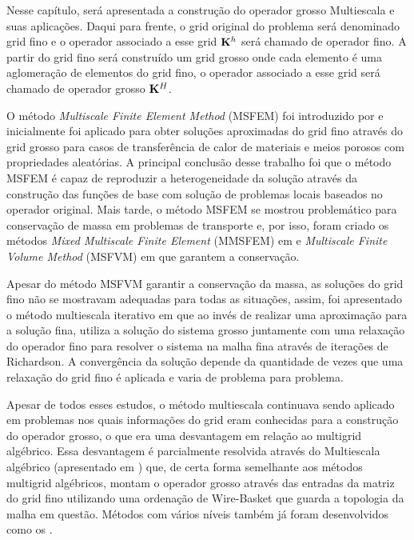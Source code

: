
Nesse capítulo, será apresentada a construção do operador grosso Multiescala e suas aplicações. Daqui para frente, o grid original do problema será denominado grid fino e o operador associado a esse grid $\mathbf{K}^h$ será chamado de operador fino. A partir do grid fino será construído um grid grosso onde cada elemento é uma aglomeração de elementos do grid fino, o operador associado a esse grid será chamado de operador grosso $\mathbf{K}^H$.


O método \textit{Multiscale Finite Element Method} (MSFEM) foi introduzido por \citet{thomashou} e inicialmente foi aplicado para obter soluções aproximadas do grid fino através do grid grosso para casos de transferência de calor de materiais e meios porosos com propriedades aleatórias. A principal conclusão desse trabalho foi que o método MSFEM é capaz de reproduzir a heterogeneidade da solução através da construção das funções de base com solução de problemas locais baseados no operador original. Mais tarde, o método MSFEM se mostrou problemático para conservação de massa em problemas de transporte e, por isso, foram criado os métodos \textit{Mixed Multiscale Finite Element} (MMSFEM) em \citet{mixedmsfem} e  \textit{Multiscale Finite Volume Method} (MSFVM) em \citet{msfv} que garantem a conservação.


Apesar do método MSFVM garantir a conservação da massa, as soluções do grid fino não se mostravam adequadas para todas as situações, assim, foi apresentado o método multiescala iterativo em \citet{iterativems} que ao invés de realizar uma aproximação para a solução fina, utiliza a solução do sistema grosso juntamente com uma relaxação do operador fino para resolver o sistema na malha fina através de iterações de Richardson. A convergência da solução depende da quantidade de vezes que uma relaxação do grid fino é aplicada e varia de problema para problema.


Apesar de todos esses estudos,  o método multiescala continuava sendo  aplicado em problemas nos quais  informações do grid eram conhecidas para a construção do operador grosso, o que era uma desvantagem em relação ao multigrid algébrico. Essa desvantagem é parcialmente resolvida através do Multiescala algébrico (apresentado em \citet{msalgebrico}) que, de certa forma semelhante aos métodos multigrid algébricos, montam o operador grosso através das entradas da matriz do grid fino utilizando uma ordenação de Wire-Basket que guarda a topologia da malha em questão. Métodos com vários níveis também já foram desenvolvidos como os \citet{multilevel}. 


